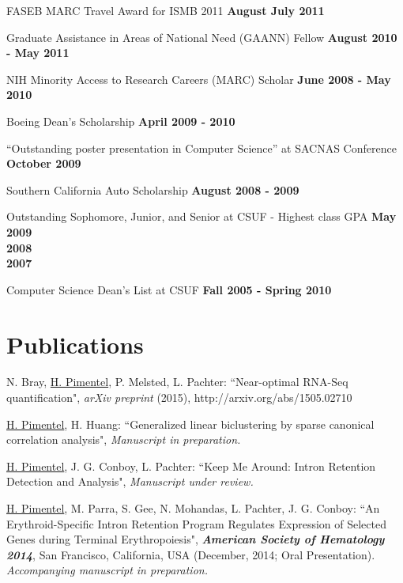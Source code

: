 \documentclass[margin,line]{res}
\begin{document}
\begin{resume}
FASEB MARC Travel Award for ISMB 2011 \hfill {\bf August
  July 2011}

Graduate Assistance in Areas of National Need (GAANN) Fellow \hfill {\bf August
  2010 - May 2011}

NIH Minority Access to Research Careers (MARC) Scholar \hfill {\bf
  June 2008 - May 2010}

Boeing Dean's Scholarship \hfill {\bf April 2009 - 2010}

``Outstanding poster presentation in Computer Science'' at SACNAS
Conference \hfill {\bf October 2009}

Southern California Auto Scholarship \hfill {\bf August 2008 - 2009}

\vspace*{1.5mm}
Outstanding Sophomore, Junior, and Senior at CSUF - Highest class GPA
\hfill {\bf May 2009}
\\
\hspace*{2cm} \hfill \textbf{2008} \\
\hspace*{2cm} \hfill \textbf{2007}

\vspace*{1.5mm}
Computer Science Dean's List at CSUF \hfill {\bf Fall 2005 - Spring 2010}

\section{\sc Publications}


N. Bray, \underline{H. Pimentel}, P. Melsted, L. Pachter: ``Near-optimal
RNA-Seq quantification", {\emph{arXiv preprint} (2015),
  http://arxiv.org/abs/1505.02710}

\underline{H. Pimentel}, H. Huang: ``Generalized linear biclustering by sparse
canonical correlation analysis", {\emph{Manuscript in preparation.}}

\underline{H. Pimentel}, J. G. Conboy, L. Pachter: ``Keep Me Around: Intron
Retention Detection and Analysis", {\emph{Manuscript under review.}}

\underline{H. Pimentel}, M. Parra, S. Gee, N. Mohandas, L. Pachter, J. G.
Conboy: ``An Erythroid-Specific Intron Retention Program Regulates Expression
of Selected Genes during Terminal Erythropoiesis", {\bf \emph{American Society
    of Hematology 2014}}, San Francisco, California, USA (December, 2014; Oral
Presentation). {\emph{Accompanying manuscript in preparation.}}


\end{resume}
\end{document}

